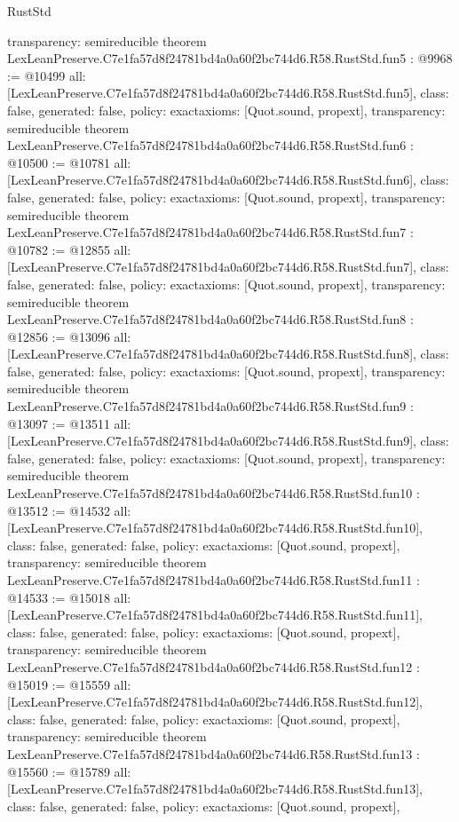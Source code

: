 \begin{lexlean}{RustStd}
\begin{coremodule}
{  transparency: semireducible
}
theorem LexLeanPreserve.C7e1fa57d8f24781bd4a0a60f2bc744d6.R58.RustStd.fun5 : @9968 := @10499 {
  all: [LexLeanPreserve.C7e1fa57d8f24781bd4a0a60f2bc744d6.R58.RustStd.fun5],
  class: false,
  generated: false,
  policy: exact{axioms: [Quot.sound, propext]},
  transparency: semireducible
}
theorem LexLeanPreserve.C7e1fa57d8f24781bd4a0a60f2bc744d6.R58.RustStd.fun6 : @10500 := @10781 {
  all: [LexLeanPreserve.C7e1fa57d8f24781bd4a0a60f2bc744d6.R58.RustStd.fun6],
  class: false,
  generated: false,
  policy: exact{axioms: [Quot.sound, propext]},
  transparency: semireducible
}
theorem LexLeanPreserve.C7e1fa57d8f24781bd4a0a60f2bc744d6.R58.RustStd.fun7 : @10782 := @12855 {
  all: [LexLeanPreserve.C7e1fa57d8f24781bd4a0a60f2bc744d6.R58.RustStd.fun7],
  class: false,
  generated: false,
  policy: exact{axioms: [Quot.sound, propext]},
  transparency: semireducible
}
theorem LexLeanPreserve.C7e1fa57d8f24781bd4a0a60f2bc744d6.R58.RustStd.fun8 : @12856 := @13096 {
  all: [LexLeanPreserve.C7e1fa57d8f24781bd4a0a60f2bc744d6.R58.RustStd.fun8],
  class: false,
  generated: false,
  policy: exact{axioms: [Quot.sound, propext]},
  transparency: semireducible
}
theorem LexLeanPreserve.C7e1fa57d8f24781bd4a0a60f2bc744d6.R58.RustStd.fun9 : @13097 := @13511 {
  all: [LexLeanPreserve.C7e1fa57d8f24781bd4a0a60f2bc744d6.R58.RustStd.fun9],
  class: false,
  generated: false,
  policy: exact{axioms: [Quot.sound, propext]},
  transparency: semireducible
}
theorem LexLeanPreserve.C7e1fa57d8f24781bd4a0a60f2bc744d6.R58.RustStd.fun10 : @13512 := @14532 {
  all: [LexLeanPreserve.C7e1fa57d8f24781bd4a0a60f2bc744d6.R58.RustStd.fun10],
  class: false,
  generated: false,
  policy: exact{axioms: [Quot.sound, propext]},
  transparency: semireducible
}
theorem LexLeanPreserve.C7e1fa57d8f24781bd4a0a60f2bc744d6.R58.RustStd.fun11 : @14533 := @15018 {
  all: [LexLeanPreserve.C7e1fa57d8f24781bd4a0a60f2bc744d6.R58.RustStd.fun11],
  class: false,
  generated: false,
  policy: exact{axioms: [Quot.sound, propext]},
  transparency: semireducible
}
theorem LexLeanPreserve.C7e1fa57d8f24781bd4a0a60f2bc744d6.R58.RustStd.fun12 : @15019 := @15559 {
  all: [LexLeanPreserve.C7e1fa57d8f24781bd4a0a60f2bc744d6.R58.RustStd.fun12],
  class: false,
  generated: false,
  policy: exact{axioms: [Quot.sound, propext]},
  transparency: semireducible
}
theorem LexLeanPreserve.C7e1fa57d8f24781bd4a0a60f2bc744d6.R58.RustStd.fun13 : @15560 := @15789 {
  all: [LexLeanPreserve.C7e1fa57d8f24781bd4a0a60f2bc744d6.R58.RustStd.fun13],
  class: false,
  generated: false,
  policy: exact{axioms: [Quot.sound, propext]},
}
\end{coremodule}
\end{lexlean}
